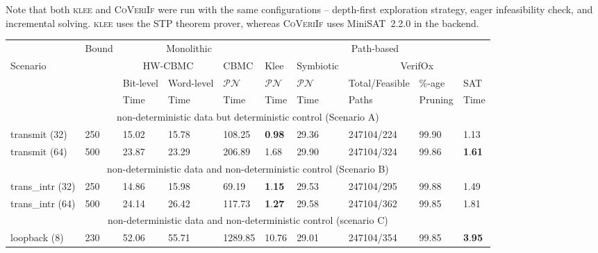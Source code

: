 \documentclass[sigconf]{acmart}
\newcommand{\tool}[1]{\textsc{#1}\xspace}
\newcommand{\verifox}{\tool{CoVeriIf}}
\newcommand{\klee}{\tool{klee}}
\newcommand{\Omit}[1]{}
\begin{document}
Note that both \klee and \verifox were run with the same configurations --
depth-first exploration strategy, eager infeasibility check, and incremental
solving.  \klee uses the STP theorem prover, whereas \verifox uses
MiniSAT~2.2.0 in the backend.

\Omit
{Besides SAT backend, \verifox also have a SMT backend. We ran our 
experiments with Z3 and observe higher verification times for Z3 compared 
to MiniSAT. So, we do not report the verification with SMT solvers.   }

\begin{table}
\begin{center}
{
\begin{scriptsize}
\begin{tabular}{|l|l|l|l|l|l|l|l|l|l|}
\hline
  & Bound & \multicolumn{3}{c|}{Monolithic} & \multicolumn{5}{c|}{Path-based} \\ 
\cline{3-10}
 Scenario &  & \multicolumn{2}{c|}{HW-CBMC} & CBMC & Klee & Symbiotic & \multicolumn{3}{c|}{VerifOx} \\ 
\cline{3-10}
      &       &  Bit-level & Word-level & $\mathcal{PN}$ & $\mathcal{PN}$ & $\mathcal{PN}$ & Total/Feasible & \%-age & SAT \\
\cline{1-7}
      &       &   Time     &   Time      & Time  &  Time & Time & Paths & Pruning & Time \\
\cline{1-10}      
\multicolumn{10}{|c|}{non-deterministic data but deterministic control (Scenario A)} \\ \hline
transmit (32) & 250 & 15.02 & 15.78 & 108.25 & \textbf{0}.\textbf{98} & 29.36 & 247104/224 & 99.90 & 1.13 \\ 
transmit (64) & 500 & 23.87 & 23.29 & 206.89 & 1.68 & 29.90 & 247104/324 & 99.86 & \textbf{1}.\textbf{61}  \\ \hline 
\multicolumn{10}{|c|}{non-deterministic data and non-deterministic control
(Scenario B)} \\ \hline
trans\_intr (32) & 250 & 14.86 & 15.98 & 69.19 & \textbf{1}.\textbf{15} & 29.53 & 247104/295 & 99.88 & 1.49 \\
trans\_intr (64) & 500 & 24.14 & 26.42 & 117.73 & \textbf{1}.\textbf{27} & 29.58 & 247104/362 & 99.85 & 1.81 \\ \hline
\multicolumn{10}{|c|}{non-deterministic data and non-deterministic control
(scenario C)} \\ \hline
loopback (8)  & 230 & 52.06 & 55.71 & 1289.85 & 10.76 & 29.01 & 247104/354 & 99.85 & \textbf{3}.\textbf{95} \\ 

\end{tabular}
\end{scriptsize}}
\end{center}
\end{table}
\end{document}
